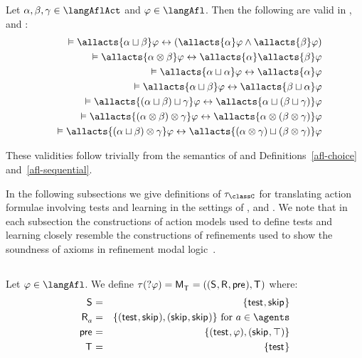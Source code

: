 \begin{proposition}\label{afl-choice-sequential-validities}
    Let $\alpha, \beta, \gamma \in \langAflAct$ and $\phi \in \langAfl$. Then the following are valid in \logicAflK{}, \logicAflKFF{} and \logicAflS{}:
    \begin{eqnarray*}
        &&\entails \allacts{\alpha \choice \beta} \phi \iff (\allacts{\alpha} \phi \land \allacts{\beta} \phi) \label{afl-axiom-choice}\\
        &&\entails \allacts{\alpha \compose \beta} \phi \iff \allacts{\alpha} \allacts{\beta} \phi \label{afl-axiom-sequential}\\
        &&\entails \allacts{\alpha \choice \alpha} \phi \iff \allacts{\alpha} \phi\\
        &&\entails \allacts{\alpha \choice \beta} \phi \iff \allacts{\beta \choice \alpha} \phi\\
        &&\entails \allacts{(\alpha \choice \beta) \choice \gamma} \phi \iff \allacts{\alpha \choice (\beta \choice \gamma)} \phi\\
        &&\entails \allacts{(\alpha \compose \beta) \compose \gamma} \phi \iff \allacts{\alpha \compose (\beta \compose \gamma)} \phi\\
        &&\entails \allacts{(\alpha \choice \beta) \compose \gamma} \phi \iff \allacts{(\alpha \compose \gamma) \choice (\beta \compose \gamma)} \phi
    \end{eqnarray*}
\end{proposition}

These validities follow trivially from the semantics of \logicAaflC{} and Definitions~\ref{afl-choice} and~\ref{afl-sequential}.

In the following subsections we give definitions of $\tau_\classC$ for translating action formulae involving tests and learning in the settings of \classK{}, \classKFF{} and \classS{}.
We note that in each subsection the constructions of action models used to define tests and learning closely resemble the constructions of refinements used to show the soundness of axioms in refinement modal logic~\cite{bozzelli:2014b,hales:2012}.

\subsection{\classK{}}

\begin{definition}[Test]\label{afl-k-test}
    Let $\phi \in \langAfl$. 
    We define $\tau(\test{\phi}) = \aPModel{\aStatesT} = \aPModelTuple{\aStatesT}$ where:
    \begin{eqnarray*}
        \aStates &=& \{\aStateTest, \aStateSkip\}\\
        \aAccessibility{\agentA} &=& \{(\aStateTest, \aStateSkip), (\aStateSkip, \aStateSkip)\} \text{ for } \agentA \in \agents\\
        \aPrecondition &=& \{(\aStateTest, \phi), (\aStateSkip, \top)\}\\
        \aStatesT &=& \{\aStateTest\}
    \end{eqnarray*}
\end{definition}

